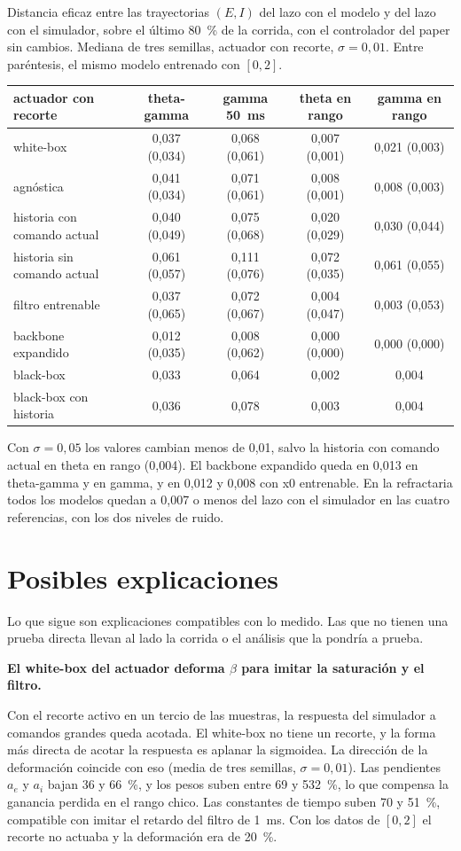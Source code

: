 \documentclass[10pt,a4paper]{article}
\newcommand{\hip}[1]{\par\smallskip\textbf{#1}\par}
\begin{document}
Distancia eficaz entre las trayectorias $(E, I)$ del lazo con el modelo y del lazo con el simulador, sobre el último 80~\% de la corrida, con el controlador del paper sin cambios. Mediana de tres semillas, actuador con recorte, $\sigma = 0{,}01$. Entre paréntesis, el mismo modelo entrenado con $[0, 2]$.

\begin{center}
\small
\begin{tabular}{@{}lcccc@{}}
\toprule
actuador con recorte & theta-gamma & gamma 50~ms & theta en rango & gamma en rango \\
\midrule
white-box & 0,037 (0,034) & 0,068 (0,061) & 0,007 (0,001) & 0,021 (0,003) \\
agnóstica & 0,041 (0,034) & 0,071 (0,061) & 0,008 (0,001) & 0,008 (0,003) \\
historia con comando actual & 0,040 (0,049) & 0,075 (0,068) & 0,020 (0,029) & 0,030 (0,044) \\
historia sin comando actual & 0,061 (0,057) & 0,111 (0,076) & 0,072 (0,035) & 0,061 (0,055) \\
filtro entrenable & 0,037 (0,065) & 0,072 (0,067) & 0,004 (0,047) & 0,003 (0,053) \\
backbone expandido & 0,012 (0,035) & 0,008 (0,062) & 0,000 (0,000) & 0,000 (0,000) \\
black-box & 0,033 & 0,064 & 0,002 & 0,004 \\
black-box con historia & 0,036 & 0,078 & 0,003 & 0,004 \\
\bottomrule
\end{tabular}
\end{center}

Con $\sigma = 0{,}05$ los valores cambian menos de 0,01, salvo la historia con comando actual en theta en rango (0,004). El backbone expandido queda en 0,013 en theta-gamma y en gamma, y en 0,012 y 0,008 con x0 entrenable. En la refractaria todos los modelos quedan a 0,007 o menos del lazo con el simulador en las cuatro referencias, con los dos niveles de ruido.

\section{Posibles explicaciones}

Lo que sigue son explicaciones compatibles con lo medido. Las que no tienen una prueba directa llevan al lado la corrida o el análisis que la pondría a prueba.

\hip{El white-box del actuador deforma $\beta$ para imitar la saturación y el filtro.}
Con el recorte activo en un tercio de las muestras, la respuesta del simulador a comandos grandes queda acotada. El white-box no tiene un recorte, y la forma más directa de acotar la respuesta es aplanar la sigmoidea. La dirección de la deformación coincide con eso (media de tres semillas, $\sigma = 0{,}01$). Las pendientes $a_e$ y $a_i$ bajan 36 y 66~\%, y los pesos suben entre 69 y 532~\%, lo que compensa la ganancia perdida en el rango chico. Las constantes de tiempo suben 70 y 51~\%, compatible con imitar el retardo del filtro de 1~ms. Con los datos de $[0, 2]$ el recorte no actuaba y la deformación era de 20~\%.
\end{document}
